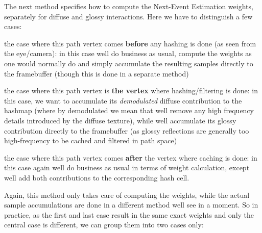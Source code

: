  \begin{DoxyParagraph}{}
The next method specifies how to compute the Next-\/\+Event Estimation weights, separately for diffuse and glossy interactions. Here we have to distinguish a few cases\+:
\begin{DoxyItemize}
\item the case where this path vertex comes {\bfseries before} any hashing is done (as seen from the eye/camera)\+: in this case we\textquotesingle{}ll do business as usual, compute the weights as one would normally do and simply accumulate the resulting samples directly to the framebuffer (though this is done in a separate method)
\item the case where this path vertex is {\bfseries the vertex} where hashing/filtering is done\+: in this case, we want to accumulate its {\itshape demodulated} diffuse contribution to the hashmap (where by demodulated we mean that we\textquotesingle{}ll remove any high frequency details introduced by the diffuse texture), while we\textquotesingle{}ll accumulate its glossy contribution directly to the framebuffer (as glossy reflections are generally too high-\/frequency to be cached and filtered in path space)
\item the case where this path vertex comes {\bfseries after} the vertex where caching is done\+: in this case again we\textquotesingle{}ll do business as usual in terms of weight calculation, except we\textquotesingle{}ll add both contributions to the corresponding hash cell. 
\end{DoxyItemize}
\end{DoxyParagraph}
\begin{DoxyParagraph}{}
Again, this method only takes care of computing the weights, while the actual sample accumulations are done in a different method we\textquotesingle{}ll see in a moment. So in practice, as the first and last case result in the same exact weights and only the central case is different, we can group them into two cases only\+:
\end{DoxyParagraph}

